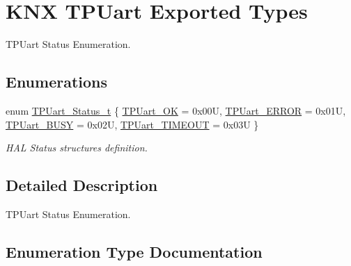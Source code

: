 \hypertarget{group___k_n_x___t_p_uart___exported___types}{}\section{K\+NX T\+P\+Uart Exported Types}
\label{group___k_n_x___t_p_uart___exported___types}


T\+P\+Uart Status Enumeration.  


\subsection*{Enumerations}
\begin{DoxyCompactItemize}
\item 
enum \hyperlink{group___k_n_x___t_p_uart___exported___types_ga75271248dbdd8cec608012ca76739f36}{T\+P\+Uart\+\_\+\+Status\+\_\+t} \{ \hyperlink{group___k_n_x___t_p_uart___exported___types_gga75271248dbdd8cec608012ca76739f36aa8bc181a8cd20f68faf0314359f58a25}{T\+P\+Uart\+\_\+\+OK} = 0x00U, 
\hyperlink{group___k_n_x___t_p_uart___exported___types_gga75271248dbdd8cec608012ca76739f36add998069d703bc6f9b5aea74aa1e501e}{T\+P\+Uart\+\_\+\+E\+R\+R\+OR} = 0x01U, 
\hyperlink{group___k_n_x___t_p_uart___exported___types_gga75271248dbdd8cec608012ca76739f36a21db4f39de08b0f35eb903cde75a2ed9}{T\+P\+Uart\+\_\+\+B\+U\+SY} = 0x02U, 
\hyperlink{group___k_n_x___t_p_uart___exported___types_gga75271248dbdd8cec608012ca76739f36aed34d4c8572d86d169518aae6d2e8730}{T\+P\+Uart\+\_\+\+T\+I\+M\+E\+O\+UT} = 0x03U
 \}\begin{DoxyCompactList}\small\item\em H\+AL Status structures definition. \end{DoxyCompactList}
\end{DoxyCompactItemize}


\subsection{Detailed Description}
T\+P\+Uart Status Enumeration. 



\subsection{Enumeration Type Documentation}
